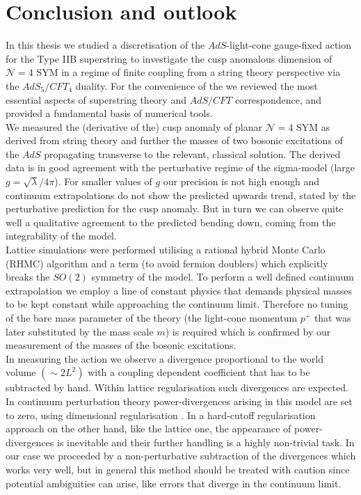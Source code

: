 \chapter{Conclusion and outlook}\label{ch: conclusion}
In this thesis we studied a discretisation of the $AdS$-light-cone gauge-fixed action for the Type IIB  superstring to investigate the cusp anomalous dimension of $\mathcal{N}=4$ SYM in a regime of finite  coupling from a string theory perspective via the $AdS_{5}/CFT_{4}$ duality. For the convenience of the we reviewed the most essential aspects of superstring theory and $AdS/CFT$ correspondence, and provided a fundamental basis of numerical tools.\\
We measured the (derivative of the) cusp anomaly of planar $\mathcal{N}=4$ SYM as derived from string theory and further the masses of two bosonic excitations of the $AdS$  propagating transverse to the relevant, classical solution. The derived data is in good agreement with the perturbative regime of the sigma-model (large $g=\sqrt{\lambda}/4\pi$). For smaller values of $g$ our  precision is not high enough and continuum extrapolations do not show the predicted upwards trend, stated by the perturbative prediction for the cusp anomaly. But in turn we can observe quite well a qualitative agreement to the predicted bending down, coming from the integrability of the model.\\
Lattice simulations were performed utilising a rational hybrid Monte Carlo \linebreak(RHMC) algorithm and a  term (to avoid fermion doublers) which explicitly breaks the $SO(2)$ symmetry of the model. To perform a well defined continuum extrapolation we employ a line of constant physics that demands physical masses to be kept constant while approaching the continuum limit. Therefore no tuning of the bare mass parameter of the theory (the light-cone momentum $p^{+}$ that was later substituted by the mass scale $m$) is required which is confirmed by our measurement of the masses of the bosonic excitations.\\
In measuring the action we observe a divergence proportional to the world volume $(\sim 2L^{2})$ with a coupling dependent coefficient that has to be subtracted by hand. Within lattice regularisation such divergences are expected. In continuum perturbation theory power-divergences arising in this model are set to zero, using dimensional regularisation \cite{Giombi:2009gd}. In a hard-cutoff regularisation approach on the other hand, like the lattice one, the appearance of power-divergences is inevitable and their further handling is a highly non-trivial task. In our case we proceeded by a non-perturbative subtraction of the divergences which works very well, but in general this method should be treated with caution since potential ambiguities can arise, like errors that diverge in the continuum limit.\\
